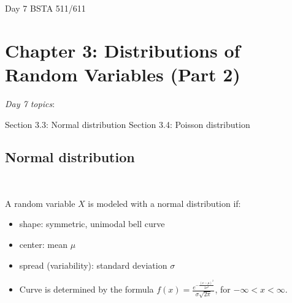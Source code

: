 \documentclass[12pt]{amsart}
\newtheorem{example}[theorem]{Example}
\newcommand{\m}{\mu}
\newcommand{\s}{\sigma}
\begin{document}
\setcounter{section}{3}
\setcounter{subsection}{1}
Day 7 BSTA 511/611
{\huge  
\section*{Chapter 3: Distributions of Random Variables (Part 2)}
}



{\large 

\emph{Day 7 topics}:

Section 3.3: Normal distribution  \newline
Section 3.4: Poisson distribution

\hrulefill

%
%
%
%
%
%






\vspace{.5cm}

\subsection{Normal distribution} $\ $ \newline

A random variable $X$ is modeled with a normal distribution if:
\begin{itemize}
\item shape: symmetric, unimodal bell curve
\item center: mean $\m$
\item spread (variability): standard deviation $\s$
\item Curve is determined by the formula $f(x) = \frac{e^{-\frac{(x-\m)^2}{2\s^2}}}{\s\sqrt{2\pi}}$, for $-\infty < x< \infty$.


\end{itemize}}
\end{document}
